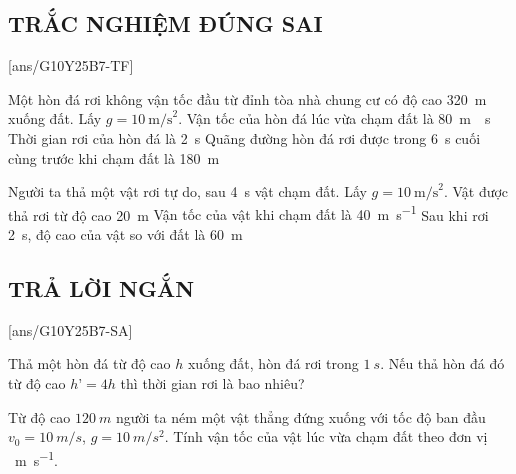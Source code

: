 \subsection{TRẮC NGHIỆM ĐÚNG SAI}
\setcounter{ex}{0}
[ans/G10Y25B7-TF]
\begin{ex}
	Một hòn đá rơi không vận tốc đầu từ đỉnh tòa nhà chung cư có độ cao \SI{320}{m} xuống đất. Lấy $g=10\ \text{m/s}^2$. 
	{\True Vận tốc của hòn đá lúc vừa chạm đất là \SI{80}{m \per s}}
	{Thời gian rơi của hòn đá là \SI{2}{s}}
	{Quãng đường hòn đá rơi được trong \SI{6}{s} cuối cùng trước khi chạm đất là \SI{180}{m}}
	\loigiai{}
\end{ex}

\begin{ex}
	Người ta thả một vật rơi tự do, sau \SI{4}{s} vật chạm đất. Lấy $g=10\ \text{m/s}^2$.
	{Vật được thả rơi từ độ cao \SI{20}{m}}
	{Vận tốc của vật khi chạm đất là \SI{40}{m\per s}}
	{\True Sau khi rơi \SI{2}{s}, độ cao của vật so với đất là \SI{60}{m}}
	\loigiai{}
\end{ex}
\subsection{TRẢ LỜI NGẮN}
\setcounter{ex}{0}
[ans/G10Y25B7-SA]
\begin{ex}
	Thả một hòn đá từ độ cao $h$ xuống đất, hòn đá rơi trong $\SI{1}{s}$. Nếu thả hòn đá đó từ độ cao $h’ = 4h$ thì thời gian rơi là bao nhiêu?
\end{ex}

\begin{ex}
	Từ độ cao $\SI{120}{m}$ người ta ném một vật thẳng đứng xuống với tốc độ ban đầu $v_0 = \SI{10}{m/s}$, $g = \SI{10}{m/s^2}$. Tính vận tốc của vật lúc vừa chạm đất theo đơn vị \SI{}{m\per s}.
\end{ex}

